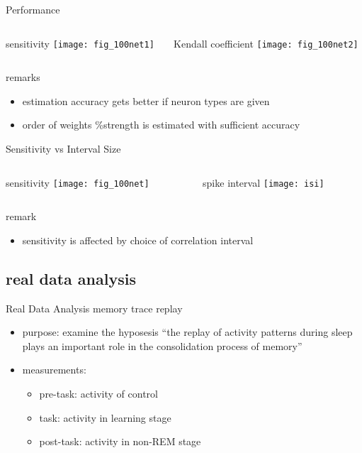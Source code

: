 \documentclass[fleqn,aspectratio=1610]{beamer}
\begin{document}
\begin{frame}[label={sec:orgec7060d}]{Performance}
\begin{columns}
\begin{column}{0.5\columnwidth}
\centering
sensitivity
\texttt{[image: fig\_100net1]}
\end{column}
\begin{column}{0.5\columnwidth}
\centering
Kendall coefficient
\texttt{[image: fig\_100net2]}
\end{column}
\end{columns}
\begin{alertblock}{remarks}
\begin{itemize}
\item estimation accuracy gets better if neuron types are given
\item order of weights \%strength
is estimated with sufficient accuracy
\end{itemize}
\end{alertblock}
\end{frame}

\begin{frame}[label={sec:org13dd66e}]{Sensitivity vs Interval Size}
\begin{columns}
\begin{column}{0.5\columnwidth}
\centering
sensitivity
\texttt{[image: fig\_100net]}
\end{column}
\begin{column}{0.5\columnwidth}
\centering
spike interval
\texttt{[image: isi]}
\end{column}
\end{columns}
\begin{alertblock}{remark}
\begin{itemize}
\item sensitivity is affected by choice of
correlation interval
\end{itemize}
\end{alertblock}
\end{frame}
\subsection{real data analysis}
\label{sec:orgc54ec7e}
\begin{frame}[label={sec:org3c2a3b9}]{Real Data Analysis}
memory trace replay
\parencites{WilsonMcNaughton1994,TatsunoLipaMcNaughton2006}

\begin{itemize}
\item purpose: 
examine the hyposesis ``the replay of activity patterns during sleep 
plays an important role in the consolidation process of memory''
\item measurements:
\begin{itemize}
\item pre-task: activity of control
\item task: activity in learning stage
\item post-task: activity in non-REM stage
\end{itemize}
\end{itemize}
\end{frame}
\end{document}
